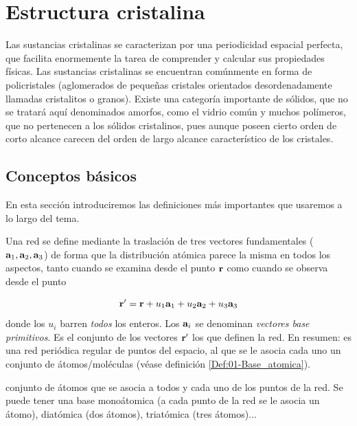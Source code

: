\chapter{Estructura cristalina} \label{Ch:01}

Las sustancias cristalinas se caracterizan por una periodicidad espacial perfecta, que facilita enormemente la tarea de comprender y calcular sus propiedades físicas. Las sustancias cristalinas se encuentran comúnmente en forma de policristales (aglomerados de pequeñas cristales orientados desordenadamente llamadas cristalitos o granos). Existe una categoría importante de sólidos, que no se tratará aquí denominados amorfos, como el vidrio común  y muchos polímeros, que no pertenecen a los sólidos cristalinos, pues aunque poseen cierto orden de corto alcance carecen del orden de largo alcance característico de los cristales.

\section{Conceptos básicos}

En esta sección introduciremos las definiciones más importantes que usaremos a lo largo del tema. \\

\begin{definition}[{\bf Red}]
	Una red se define mediante la traslación de tres vectores fundamentales ($\mathbf{a}_1,\mathbf{a}_2,\mathbf{a}_3$) de forma que la distribución atómica parece la misma en todos los aspectos, tanto cuando se examina desde el punto $\mathbf{r}$ como cuando se observa desde el punto 

    \begin{equation}
        \mathbf{r}' =\mathbf{r}+ u_1 \mathbf{a}_1 + u_2 \mathbf{a}_2 + u_3 \mathbf{a}_3 \label{Ec:01-01-01} 
    \end{equation}
    donde los $u_i$ barren {\it todos} los enteros. Los $\mathbf{a}_i$ se denominan {\it vectores base primitivos}. Es el conjunto de los vectores $\mathbf{r}'$ los que definen la red. En resumen: es una red periódica regular de puntos del espacio, al que se le asocia cada uno un conjunto de átomos/moléculas (véase definición \ref{Def:01-Base_atomica}). 
\end{definition}

\begin{definition}
    conjunto de átomos que se asocia a todos y cada uno de los puntos de la red. Se puede tener una base monoátomica (a cada punto de la red se le asocia un átomo), diatómica (dos átomos), triatómica (tres átomos)...
    \label{Def:01-Base_atomica}
\end{definition}

